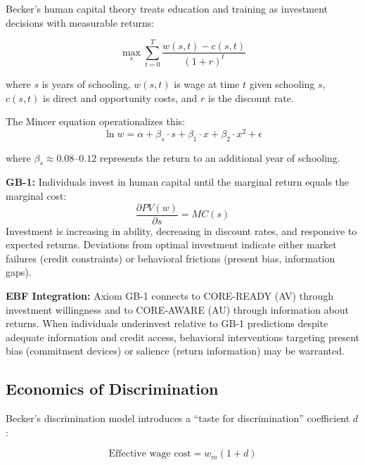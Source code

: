 Becker's human capital theory \citep{becker1964human} treats education and training as investment decisions with measurable returns:

\begin{equation}
\max_{s} \sum_{t=0}^{T} \frac{w(s,t) - c(s,t)}{(1+r)^t}
\label{eq:gb-human-capital}
\end{equation}

where $s$ is years of schooling, $w(s,t)$ is wage at time $t$ given schooling $s$, $c(s,t)$ is direct and opportunity costs, and $r$ is the discount rate.

The Mincer equation operationalizes this:
\begin{equation}
\ln w = \alpha + \beta_s \cdot s + \beta_1 \cdot x + \beta_2 \cdot x^2 + \epsilon
\label{eq:gb-mincer}
\end{equation}

where $\beta_s \approx 0.08$--$0.12$ represents the return to an additional year of schooling.

\begin{axiom}
\label{ax:gb-1}
\textbf{GB-1:} Individuals invest in human capital until the marginal return equals the marginal cost:
\begin{equation}
\frac{\partial PV(w)}{\partial s} = MC(s)
\end{equation}
Investment is increasing in ability, decreasing in discount rates, and responsive to expected returns. Deviations from optimal investment indicate either market failures (credit constraints) or behavioral frictions (present bias, information gaps).
\end{axiom}

\textbf{EBF Integration:} Axiom GB-1 connects to CORE-READY (AV) through investment willingness and to CORE-AWARE (AU) through information about returns. When individuals underinvest relative to GB-1 predictions despite adequate information and credit access, behavioral interventions targeting present bias (commitment devices) or salience (return information) may be warranted.

\subsection{Economics of Discrimination}
\label{subsec:gb-discrimination}

Becker's discrimination model \citep{becker1957economics} introduces a ``taste for discrimination'' coefficient $d$:

\begin{equation}
\text{Effective wage cost} = w_m(1 + d)
\label{eq:gb-discrimination}
\end{equation}

